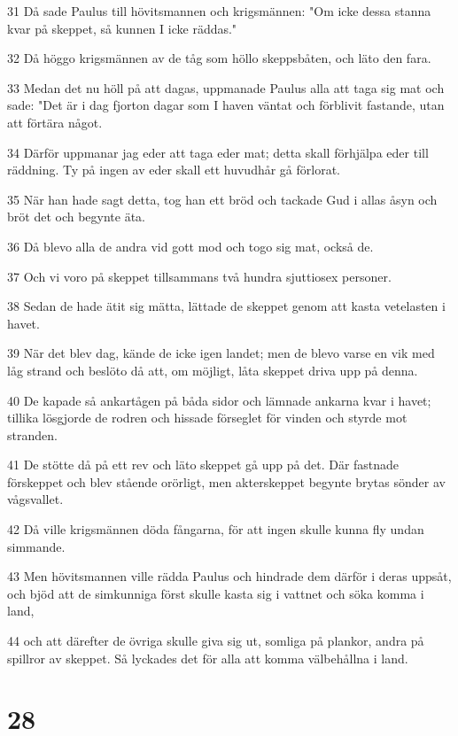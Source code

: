 \par 31 Då sade Paulus till hövitsmannen och krigsmännen: "Om icke dessa stanna kvar på skeppet, så kunnen I icke räddas."
\par 32 Då höggo krigsmännen av de tåg som höllo skeppsbåten, och läto den fara.
\par 33 Medan det nu höll på att dagas, uppmanade Paulus alla att taga sig mat och sade: "Det är i dag fjorton dagar som I haven väntat och förblivit fastande, utan att förtära något.
\par 34 Därför uppmanar jag eder att taga eder mat; detta skall förhjälpa eder till räddning. Ty på ingen av eder skall ett huvudhår gå förlorat.
\par 35 När han hade sagt detta, tog han ett bröd och tackade Gud i allas åsyn och bröt det och begynte äta.
\par 36 Då blevo alla de andra vid gott mod och togo sig mat, också de.
\par 37 Och vi voro på skeppet tillsammans två hundra sjuttiosex personer.
\par 38 Sedan de hade ätit sig mätta, lättade de skeppet genom att kasta vetelasten i havet.
\par 39 När det blev dag, kände de icke igen landet; men de blevo varse en vik med låg strand och beslöto då att, om möjligt, låta skeppet driva upp på denna.
\par 40 De kapade så ankartågen på båda sidor och lämnade ankarna kvar i havet; tillika lösgjorde de rodren och hissade förseglet för vinden och styrde mot stranden.
\par 41 De stötte då på ett rev och läto skeppet gå upp på det. Där fastnade förskeppet och blev stående orörligt, men akterskeppet begynte brytas sönder av vågsvallet.
\par 42 Då ville krigsmännen döda fångarna, för att ingen skulle kunna fly undan simmande.
\par 43 Men hövitsmannen ville rädda Paulus och hindrade dem därför i deras uppsåt, och bjöd att de simkunniga först skulle kasta sig i vattnet och söka komma i land,
\par 44 och att därefter de övriga skulle giva sig ut, somliga på plankor, andra på spillror av skeppet. Så lyckades det för alla att komma välbehållna i land.

\chapter{28}

